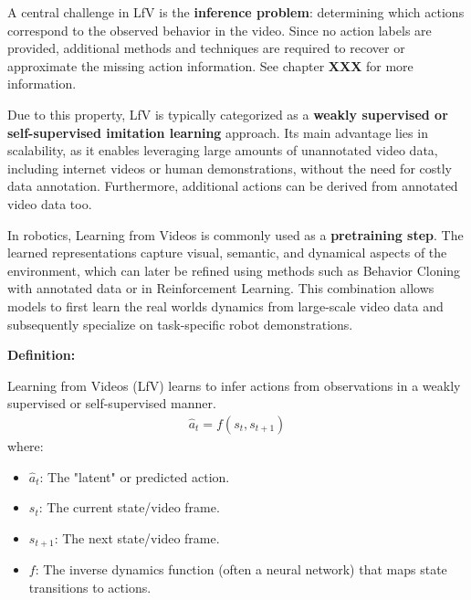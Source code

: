 A central challenge in LfV is the \textbf{inference problem}: determining which actions correspond to the observed behavior in the video. Since no action labels are provided, additional methods and techniques are required to recover or approximate the missing action information. See chapter \textbf{XXX} for more information.

Due to this property, LfV is typically categorized as a \textbf{weakly supervised or self-supervised imitation learning} approach. 
Its main advantage lies in scalability, as it enables leveraging large amounts of unannotated video data, including internet videos or human demonstrations, without the need for costly data annotation. Furthermore, additional actions can be derived from annotated video data too.


In robotics, Learning from Videos is commonly used as a \textbf{pretraining step}. The learned representations capture visual, semantic, and dynamical aspects of the environment, which can later be refined using methods such as Behavior Cloning with annotated data or in Reinforcement Learning. This combination allows models to first learn the real worlds dynamics from large-scale video data and subsequently specialize on task-specific robot demonstrations.


\textbf{Definition:}

Learning from Videos (LfV) learns to infer actions from observations in a weakly supervised or self-supervised manner. 
\begin{align}
	\hat{a}_t = f(s_t, s_{t+1})
\end{align}
where:
\begin{itemize}
	\item $\hat{a}_t$: The "latent" or predicted action.
	\item $s_t$: The current state/video frame.
	\item $s_{t+1}$: The next state/video frame.
	\item $f$: The inverse dynamics function (often a neural network) that maps state transitions to actions.
\end{itemize}







